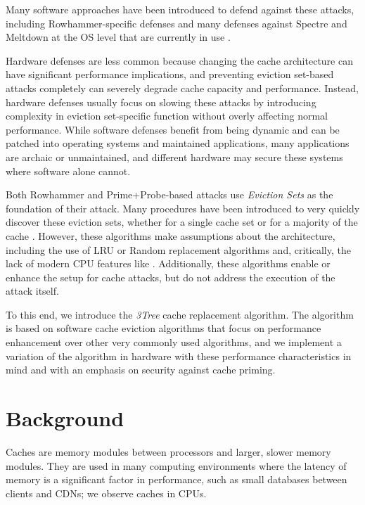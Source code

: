 \documentclass[letterpaper, twocolumn]{article}
\begin{document}
Many software approaches have been introduced to defend against these attacks,
including Rowhammer-specific defenses
\cite{RowhammerDefense} %
and many defenses against Spectre and Meltdown at the OS level that are currently in use
.

Hardware defenses are less common because changing the cache architecture can have
significant performance implications,
and preventing eviction set-based attacks completely can severely degrade
cache capacity and performance.
Instead, hardware defenses usually focus on slowing these attacks
by introducing complexity in eviction set-specific function
without overly affecting normal performance.
While software defenses benefit from being dynamic
and can be patched into operating systems and maintained applications,
many applications are archaic or unmaintained, and different hardware may secure these systems
where software alone cannot.

Both Rowhammer and Prime+Probe-based attacks use \textit{Eviction Sets}
as the foundation of their attack.
Many procedures have been introduced to very quickly discover these eviction sets,
whether for a single cache set \cite{TPFES}
or for a majority of the cache \cite{EvictionSetsAtScale}.
However, these algorithms make assumptions about the architecture,
including the use of LRU or Random replacement algorithms
and, critically, the lack of modern CPU features like 
\cite{EvictionSetsAtScale}.
Additionally, these algorithms enable or enhance the setup for cache attacks,
but do not address the execution of the attack itself.

To this end, we introduce the \textit{3Tree} cache replacement algorithm.
The algorithm is based on software cache eviction algorithms that focus on
performance enhancement over other very commonly used algorithms,
and we implement a variation of the algorithm in hardware
with these performance characteristics in mind
and with an emphasis on security against cache priming.


\section{Background}

Caches are memory modules between processors and larger, slower memory modules.
They are used in many computing environments where the latency of memory
is a significant factor in performance,
such as small databases between clients and CDNs; we observe caches in CPUs.
\end{document}
